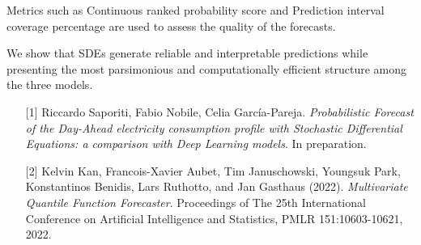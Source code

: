 \begin{talk}
Metrics such as Continuous ranked probability score and Prediction interval coverage percentage are used to assess the quality of the forecasts. 

We show that SDEs generate reliable and interpretable predictions while presenting the most parsimonious and computationally efficient structure among the three models.


\medskip

 

\begin{enumerate}
    \item[{[1]}] Riccardo Saporiti, Fabio Nobile, Celia García-Pareja. {\it Probabilistic Forecast of the Day-Ahead electricity consumption profile with Stochastic Differential Equations: a comparison with Deep Learning models}. In preparation.

	\item[{[2]}] Kelvin Kan, Francois-Xavier Aubet, Tim Januschowski, Youngsuk Park, Konstantinos Benidis, Lars Ruthotto, and Jan Gasthaus (2022). {\it Multivariate Quantile Function Forecaster}. Proceedings of The 25th International Conference on Artificial Intelligence and Statistics, PMLR 151:10603-10621, 2022.
 
\end{enumerate}
 
\end{talk}

